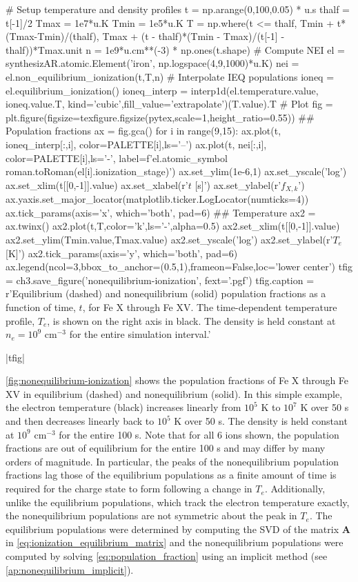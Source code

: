 \begin{pycode}[chapter3]
# Setup temperature and density profiles
t = np.arange(0,100,0.05) * u.s
thalf = t[-1]/2
Tmax = 1e7*u.K
Tmin = 1e5*u.K
T = np.where(t <= thalf, Tmin + t*(Tmax-Tmin)/(thalf),
             Tmax + (t - thalf)*(Tmin - Tmax)/(t[-1] - thalf))*Tmax.unit
n = 1e9*u.cm**(-3) * np.ones(t.shape)
# Compute NEI
el = synthesizAR.atomic.Element('iron', np.logspace(4,9,1000)*u.K)
nei = el.non_equilibrium_ionization(t,T,n)
# Interpolate IEQ populations
ioneq = el.equilibrium_ionization()
ioneq_interp = interp1d(el.temperature.value, ioneq.value.T, 
                        kind='cubic',fill_value='extrapolate')(T.value).T
# Plot
fig = plt.figure(figsize=texfigure.figsize(pytex,scale=1,height_ratio=0.55))
## Population fractions
ax = fig.gca()
for i in range(9,15):
    ax.plot(t, ioneq_interp[:,i], color=PALETTE[i],ls='--')
    ax.plot(t, nei[:,i], color=PALETTE[i],ls='-',
            label=f'{el.atomic_symbol} {roman.toRoman(el[i].ionization_stage)}')
ax.set_ylim(1e-6,1)
ax.set_yscale('log')
ax.set_xlim(t[[0,-1]].value)
ax.set_xlabel(r'$t$ [s]')
ax.set_ylabel(r'$f_{X,k}$')
ax.yaxis.set_major_locator(matplotlib.ticker.LogLocator(numticks=4))
ax.tick_params(axis='x', which='both', pad=6)
## Temperature
ax2 = ax.twinx()
ax2.plot(t,T,color='k',ls='-',alpha=0.5)
ax2.set_xlim(t[[0,-1]].value)
ax2.set_ylim(Tmin.value,Tmax.value)
ax2.set_yscale('log')
ax2.set_ylabel(r'$T_e$ [K]')
ax2.tick_params(axis='y', which='both', pad=6)
ax.legend(ncol=3,bbox_to_anchor=(0.5,1),frameon=False,loc='lower center')
tfig = ch3.save_figure('nonequilibrium-ionization', fext='.pgf')
tfig.caption = r'Equilibrium (dashed) and nonequilibrium (solid) population fractions as a function of time, $t$, for Fe X through Fe XV. The time-dependent temperature profile, $T_e$, is shown on the right axis in black. The density is held constant at $n_e=10^9$ cm$^{-3}$ for the entire simulation interval.'
\end{pycode}
\py[chapter3]|tfig|

\autoref{fig:nonequilibrium-ionization} shows the population fractions of Fe X through Fe XV in equilibrium (dashed) and nonequilibrium (solid). In this simple example, the electron temperature (black) increases linearly from $10^5$ K to $10^7$ K over 50 s and then decreases linearly back to $10^5$ K over 50 s. The density is held constant at $10^9$ cm$^{-3}$ for the entire 100 s. Note that for all 6 ions shown, the population fractions are out of equilibrium for the entire 100 s and may differ by many orders of magnitude. In particular, the peaks of the nonequilibrium population fractions lag those of the equilibrium populations as a finite amount of time is required for the charge state to form following a change in $T_e$. Additionally, unlike the equilibrium populations, which track the electron temperature exactly, the nonequilibrium populations are not symmetric about the peak in $T_e$. The equilibrium populations were determined by computing the SVD of the matrix $\mathbf{A}$ in \autoref{eq:ionization_equilibrium_matrix} and the nonequilibrium populations were computed by solving \autoref{eq:population_fraction} using an implicit method (see \autoref{ap:nonequilibrium_implicit}).

